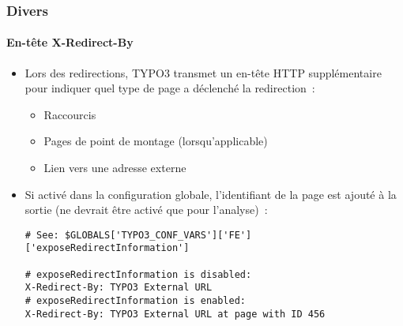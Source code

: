%

\begin{frame}[fragile]
	\frametitle{Divers}
	\framesubtitle{En-tête X-Redirect-By}


	\begin{itemize}
		\item Lors des redirections, TYPO3 transmet un en-tête HTTP supplémentaire pour indiquer
			quel type de page a déclenché la redirection~:
			\begin{itemize}\small
				\item Raccourcis
				\item Pages de point de montage (lorsqu'applicable)
				\item Lien vers une adresse externe
			\end{itemize}\normalsize
		\item Si activé dans la configuration globale, l'identifiant de la page est ajouté à la sortie
			(ne devrait être activé que pour l'analyse)~:
\begin{lstlisting}
# See: $GLOBALS['TYPO3_CONF_VARS']['FE']['exposeRedirectInformation']

# exposeRedirectInformation is disabled:
X-Redirect-By: TYPO3 External URL
# exposeRedirectInformation is enabled:
X-Redirect-By: TYPO3 External URL at page with ID 456
\end{lstlisting}

	\end{itemize}

\end{frame}

